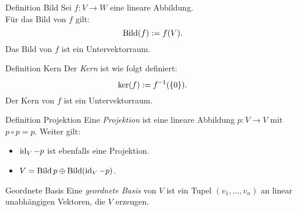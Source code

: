 \documentclass[main.tex]{subfiles}
\begin{document}
\begin{karte}{Definition Bild}
    Sei \( f: V \rightarrow W \) eine lineare Abbildung.\\
    Für das Bild von \(f\) gilt:
    \[ \operatorname{Bild}(f) := f(V). \]
    Das Bild von \(f\) ist ein Untervektorraum.
\end{karte}
\begin{karte}{Definition Kern}
    Der \textit{Kern} ist wie folgt definiert:
    \[ \ker(f) := \inverse{f}(\set{0}). \]
    Der Kern von \(f\) ist ein Untervektorraum.
\end{karte}
\begin{karte}{Definition Projektion}
    Eine \textit{Projektion} ist eine lineare Abbildung \(p: V \rightarrow V\)
    mit \(p \circ p = p\). Weiter gilt: 
    \begin{itemize}
        \item \(\operatorname{id}_V - p\) ist ebenfalls eine Projektion.
        \item \(V = \operatorname{Bild} p \oplus \operatorname{Bild} (\operatorname{id}_V - p) \).
    \end{itemize}     
\end{karte}
\begin{karte}{Geordnete Basis}
    Eine \textit{geordnete Basis} von \(V\) ist ein Tupel \( (v_1,\ldots,v_n) \) 
    an linear unabhängigen Vektoren, die \(V\) erzeugen.
\end{karte}
\end{document}
